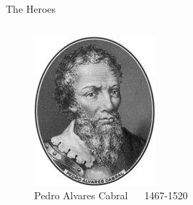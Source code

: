 \documentclass{beamer}
\begin{document}
\begin{frame}{The Heroes}
\begin{columns}
\begin{figure}[ht]
\begin{center}
	\includegraphics[width=0.9 \columnwidth]{Cabral.jpg}
	\caption{\tiny Pedro Alvares Cabral ~~ 1467-1520}
	\end{center}
	\end{figure}


\end{columns}
\end{frame}
\end{document}
